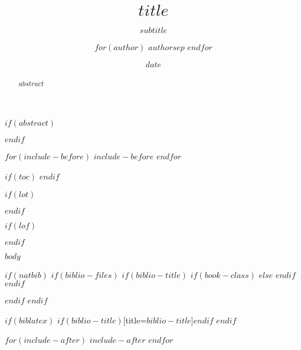 \documentclass[
    $if(fontsize)$
        $fontsize$,
    $endif$
    $if(lang)$
        $lang$,
    $endif$
    $if(papersize)$
        $papersize$,
    $endif$
    $for(classoption)$
        $classoption$
        $sep$,
    $endfor$
]
{$documentclass$}
\title{$title$}
\title{}
\subtitle{$subtitle$}
\author{
        $for(author)$
            $author$$sep$
        $endfor$
    }
\author{}
\date{$date$}
\date{}
\begin{document}
\maketitle

$if(abstract)$
    \begin{abstract}
    $abstract$
    \end{abstract}
$endif$

$for(include-before)$
    $include-before$
$endfor$

$if(toc)$
    {
        \hypersetup{linkcolor=black}
        \setcounter{tocdepth}{$toc-depth$}
        \tableofcontents
    }
$endif$


$if(lot)$
    \listoftables
$endif$

$if(lof)$
    \listoffigures
$endif$

$body$

$if(natbib)$
    $if(biblio-files)$
        $if(biblio-title)$
            $if(book-class)$
                \renewcommand\bibname{$biblio-title$}
            $else$
                \renewcommand\refname{$biblio-title$}
            $endif$
        $endif$
        
        
    $endif$
$endif$


$if(biblatex)$
    \printbibliography$if(biblio-title)$[title=$biblio-title$]$endif$
$endif$

$for(include-after)$
    $include-after$
$endfor$
\end{document}
